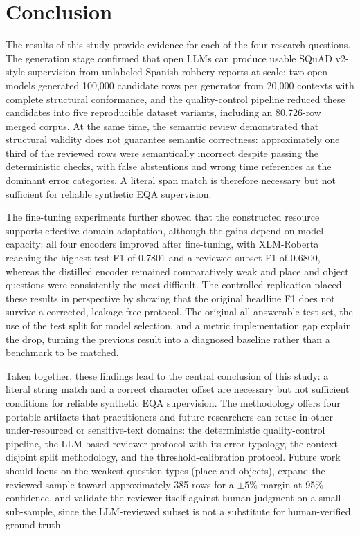 \documentclass[graybox]{SNmult}
\begin{document}
\section{Conclusion}
\label{sec:conclusion}

The results of this study provide evidence for each of the four research
questions. The generation stage confirmed that open LLMs can produce usable
SQuAD v2-style supervision from unlabeled Spanish robbery reports at scale: two
open models generated 100{,}000 candidate rows per generator from 20{,}000
contexts with complete structural conformance, and the quality-control pipeline
reduced these candidates into five reproducible dataset variants, including an
80{,}726-row merged corpus. At the same time, the semantic review demonstrated
that structural validity does not guarantee semantic correctness:
approximately one third of the reviewed rows were semantically incorrect
despite passing the deterministic checks, with false abstentions and wrong time
references as the dominant error categories. A literal span match is therefore
necessary but not sufficient for reliable synthetic EQA supervision.

The fine-tuning experiments further showed that the constructed resource
supports effective domain adaptation, although the gains depend on model
capacity: all four encoders improved after fine-tuning, with XLM-Roberta
reaching the highest test F1 of 0.7801 and a reviewed-subset F1 of 0.6800,
whereas the distilled encoder remained comparatively weak and place and object
questions were consistently the most difficult. The controlled replication
placed these results in perspective by showing that the original headline F1
does not survive a corrected, leakage-free protocol. The original all-answerable
test set, the use of the test split for model selection, and a metric
implementation gap explain the drop, turning the previous result into a
diagnosed baseline rather than a benchmark to be matched.

Taken together, these findings lead to the central conclusion of this study: a
literal string match and a correct character offset are necessary but not
sufficient conditions for reliable synthetic EQA supervision. The methodology
offers four portable artifacts that practitioners and future researchers can
reuse in other under-resourced or sensitive-text domains: the deterministic
quality-control pipeline, the LLM-based reviewer protocol with its error
typology, the context-disjoint split methodology, and the threshold-calibration
protocol. Future work should focus on the weakest question types (place and
objects), expand the reviewed sample toward approximately 385 rows for a
$\pm 5\%$ margin at 95\% confidence, and validate the reviewer itself against
human judgment on a small sub-sample, since the LLM-reviewed subset is not a
substitute for human-verified ground truth.
\end{document}
